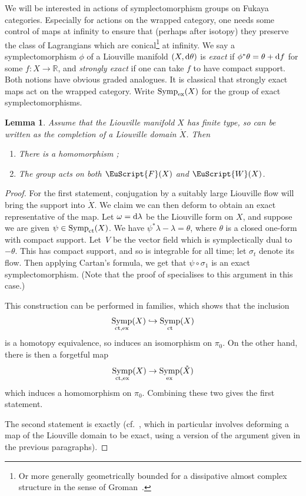 \documentclass[pdftex]{sigma}
\newcommand{\scrF}{\EuScript{F}}
\def\scrW{\EuScript{W}}
\DeclareMathOperator{\Symp}{Symp}
\def\bR{\mathbb{R}}
\newtheorem{lem}[thm]{Lemma}
\theoremstyle{definition}
\numberwithin{equation}{section}
\begin{document}
We will be interested in actions of symplectomorphism groups on Fukaya categories. Especially for actions on the wrapped category, one needs some control of maps at infinity to ensure that (perhaps after isotopy) they preserve the class of Lagrangians which are conical\footnote{Or more generally geometrically bounded for a dissipative almost complex structure in the sense of Groman~\cite{Groman}.} at infinity. We say a symplectomorphism $\phi$ of a Liouville manifold $(X,{\rm d}\theta)$ is \emph{exact} if $\phi^*\theta = \theta + {\rm d}f$ for some $f\colon X \to \bR$, and \emph{strongly exact} if one can take $f$ to have compact support. Both notions have obvious graded analogues. It is classical that strongly exact maps act on the wrapped category. Write $\Symp_{\rm ex}(X)$ for the group of exact symplectomorphisms.

\begin{lem}\label{lem:acts}
 Assume that the Liouville manifold $X$ has finite type, so can be written as the completion of a Liouville domain $\mathring{X}$. Then
 \begin{enumerate}\itemsep=0pt
 \item[$(1)$] There is a homomorphism \smash{$\pi_0\Symp_{\rm ct}(X) \to \pi_0\Symp_{\rm ex}\bigl(\mathring{X}\bigr)$};
 \item[$(2)$] The group \smash{$\pi_0\Symp\bigl(\mathring{X}\bigr)$} acts on both $\scrF(X)$ and $\scrW(X)$.
 \end{enumerate}
\end{lem}

\begin{proof}
 For the first statement, conjugation by a suitably large Liouville flow will bring the support into $\mathring{X}$. We claim we can then deform to obtain an exact representative of the map. Let $\omega = {\rm d} \lambda$ be the Liouville form on $X$, and suppose we are given $\psi \in \Symp_{\rm ct} (X)$. We have $\psi^\ast \lambda - \lambda = \theta$, where $\theta$ is a closed one-form with compact support. Let~$V$ be the vector field which is symplectically dual to $-\theta$. This has compact support, and so is integrable for all time; let $\sigma_t$ denote its flow. Then applying Cartan's formula, we get that $\psi \circ \sigma_1 $ is an exact symplectomorphism. (Note that the proof of \cite[Lemma~1.1]{BEE} specialises to this argument in this case.)

 This construction can be performed in families, which shows that the inclusion
 \[
 \Symp_{\rm ct,ex}(X) \hookrightarrow \Symp_{\rm ct}(X)
 \]
 is a homotopy equivalence, so induces an isomorphism on $\pi_0$. On the other hand, there is then a forgetful map
 \[
 \Symp_{\rm ct,ex}(X) \to \Symp_{\rm ex}(\mathring{X})
 \]
 which induces a homomorphism on $\pi_0$. Combining these two gives the first statement.

 The second statement is exactly \cite[Corollary~2.4]{Keating-Smith} (cf.~\cite{KS:corr}, which in particular involves deforming a map of the Liouville domain to be exact, using a version of the argument given in the previous paragraphs).
\end{proof}
\end{document}
